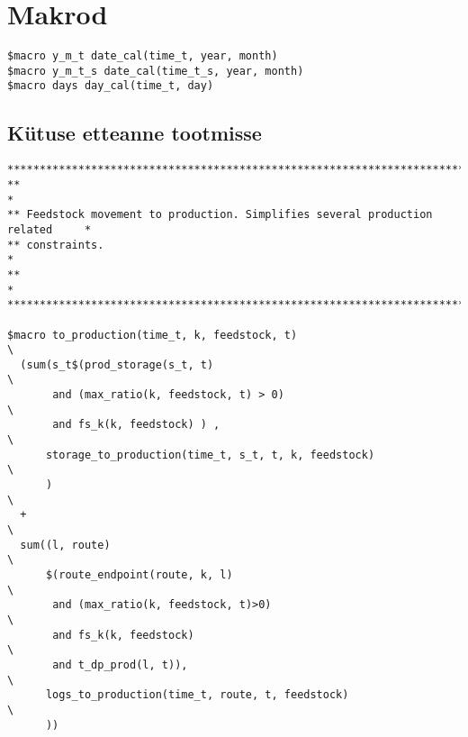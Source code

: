 \section{Makrod}
\label{app:makrod}

\begin{verbatim}
$macro y_m_t date_cal(time_t, year, month)
$macro y_m_t_s date_cal(time_t_s, year, month)
$macro days day_cal(time_t, day)
\end{verbatim}

\subsection{Kütuse etteanne tootmisse}
\begin{verbatim}
********************************************************************************
**                                                                             *
** Feedstock movement to production. Simplifies several production related     *
** constraints.                                                                *
**                                                                             *
********************************************************************************

$macro to_production(time_t, k, feedstock, t)                                  \
  (sum(s_t$(prod_storage(s_t, t)                                               \
       and (max_ratio(k, feedstock, t) > 0)                                    \
       and fs_k(k, feedstock) ) ,                                              \
      storage_to_production(time_t, s_t, t, k, feedstock)                      \
      )                                                                        \
  +                                                                            \
  sum((l, route)                                                               \
      $(route_endpoint(route, k, l)                                            \
       and (max_ratio(k, feedstock, t)>0)                                      \
       and fs_k(k, feedstock)                                                  \
       and t_dp_prod(l, t)),                                                   \
      logs_to_production(time_t, route, t, feedstock)                          \
      ))


\end{verbatim}
